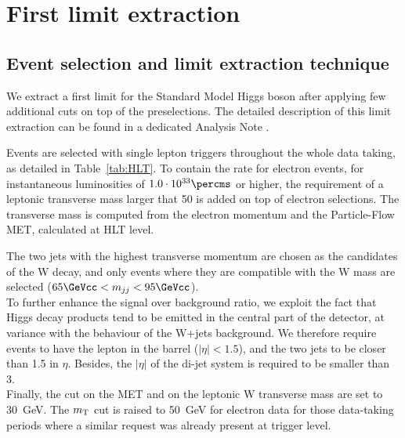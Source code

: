 \section{First limit extraction}
\label{sec:firstExtraction}

\subsection{Event selection and limit extraction technique}

We extract a first limit for the Standard Model Higgs boson after applying few additional cuts on
top of the preselections. The detailed description of this limit extraction can be found in a
dedicated Analysis Note \cite{CMS-AN-12-029}.

Events are selected with single lepton triggers throughout the whole data taking, as detailed in
Table~\ref{tab:HLT}. To contain the rate for electron events, for instantaneous luminosities of
$1.0\cdot10^{33}\percms$ or higher, the requirement of a leptonic transverse mass larger that 50\GeV
is added on top of electron selections. The transverse mass is computed from the electron momentum
and the Particle-Flow MET, calculated at HLT level.

The two jets with the highest transverse momentum are chosen as the candidates of the W decay, and
only events where they are compatible with the W mass are selected ($65\GeVcc < m_{jj} < 95\GeVcc$).\\
To further enhance the signal over background ratio, we exploit the fact that Higgs decay products 
tend to be emitted in the central part of the detector, at variance with the behaviour of the W+jets
background. We therefore require events to have the lepton in the barrel ($|\eta|<1.5$), and the two
jets to be closer than 1.5 in $\eta$. Besides, the $|\eta|$ of the di-jet system is required to be
smaller than 3.\\
Finally, the cut on the MET and on the leptonic W transverse mass are set to 30~GeV. The
$m_{\textnormal{T}}$ cut is raised to 50~GeV for electron data for those data-taking periods where
a similar request was already present at trigger level.

